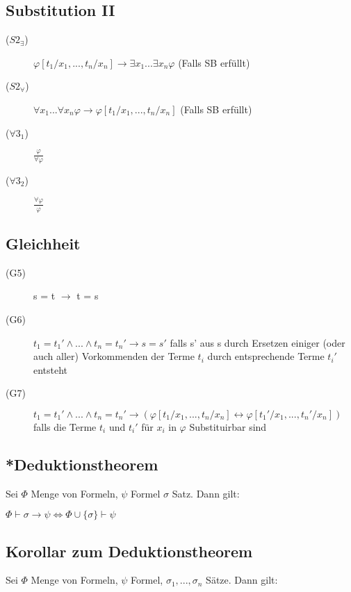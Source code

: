 \documentclass[12pt,a4paper]{article} %
\begin{document}
	\subsection{Substitution II}
	\begin{description}
		\item[($S2_{\exists}$)] $\varphi[t_1/x_1, ..., t_n/x_n] \rightarrow \exists x_1 ... \exists x_n \varphi$ (Falls SB erfüllt)
		\item[($S2_{\forall}$)] $\forall x_1 ... \forall x_n \varphi \rightarrow \varphi[t_1/x_1, ..., t_n/x_n]$ (Falls SB erfüllt)
		\item[($\forall 3_1$)] $\frac{\varphi}{\forall \varphi}$
		\item[($\forall 3_2$)] $\frac{\forall \varphi}{\varphi}$
	\end{description}

	\subsection{Gleichheit}
	\begin{description}
		\item[(G5)] s = t $\rightarrow$ t = s
		\item[(G6)] $t_1 = t_1' \land ... \land t_n = t_n' \rightarrow s = s'$ \newline
		falls s' aus s durch Ersetzen einiger (oder auch aller) Vorkommenden der Terme $t_i$ durch entsprechende Terme $t_i'$ entsteht
		\item[(G7)] $t_1 = t_1' \land ... \land t_n = t_n' \rightarrow (\varphi[t_1/x_1, ..., t_n/x_n] \leftrightarrow \varphi[t_1'/x_1, ..., t_n'/x_n])$ \newline 
		falls die Terme $t_i$ und $t_i'$ für $x_i$ in $\varphi$ Substituirbar sind
	\end{description}

	\subsection{*Deduktionstheorem}
	Sei $\Phi$ Menge von Formeln, $\psi$ Formel $\sigma$ Satz. Dann gilt: 
	
	$\Phi \hyperref[Beweisbar]{\vdash} \sigma \rightarrow \psi \Leftrightarrow \Phi \cup \{\sigma\} \hyperref[Beweisbar]{\vdash} \psi$
	
	\subsection{Korollar zum Deduktionstheorem}
	Sei $\Phi$ Menge von Formeln, $\psi$ Formel, $\sigma_1, ..., \sigma_n$ Sätze. Dann gilt:
	
\end{document}
